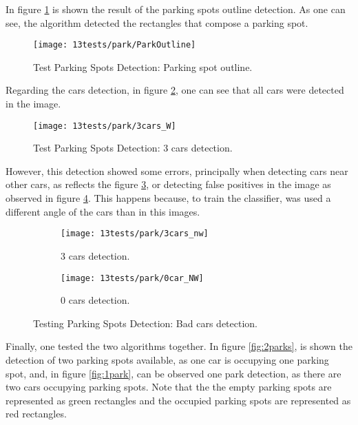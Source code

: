 In figure \ref{fig:parkoutline} is shown the result of the parking spots outline detection. As one can see, the algorithm detected the rectangles that compose a parking spot.

\begin{figure}[H]
	\centering	
	\texttt{[image: 13tests/park/ParkOutline]}
	\caption{Test Parking Spots Detection: Parking spot outline.}
	\label{fig:parkoutline}
\end{figure}

Regarding the cars detection, in figure \ref{fig:carsDetect}, one can see that all cars were detected in the image.

\begin{figure}[H]
	\centering	
	\texttt{[image: 13tests/park/3cars\_W]}
	\caption{Test Parking Spots Detection: 3 cars detection.}
	\label{fig:carsDetect}
\end{figure}

However, this detection showed some errors, principally when detecting cars near other cars, as reflects the figure \ref{fig:carsNW}, or detecting false positives in the image as observed in figure \ref{fig:0carsNW}. This happens because, to train the classifier, was used a different angle of the cars than in this images. 

\begin{figure}[H]
	\centering
	\begin{subfigure}{.4\textwidth}
		\centering
		\texttt{[image: 13tests/park/3cars\_nw]}
		\caption{3 cars detection.}
		\label{fig:carsNW}
	\end{subfigure}%
	\begin{subfigure}{.4\textwidth}
		\centering
		\texttt{[image: 13tests/park/0car\_NW]}
		\caption{0 cars detection.}
		\label{fig:0carsNW}
	\end{subfigure}
	\caption{Testing Parking Spots Detection: Bad cars detection.}
	\label{fig:cars}
\end{figure}

Finally, one tested the two algorithms together. In figure \ref{fig:2parks}, is shown the detection of two parking spots available, as one car is occupying one parking spot, and, in figure \ref{fig:1park}, can be observed one park detection, as there are two cars occupying parking spots. Note that the the empty parking spots are represented as green rectangles and the occupied parking spots are represented as red rectangles.

